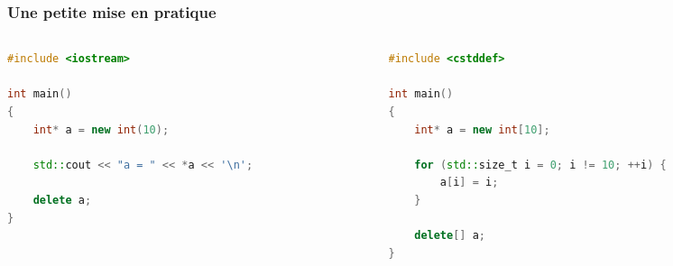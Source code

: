\documentclass{cppcourses}
\begin{document}
\begin{frame}[fragile]

\frametitle{Une petite mise en pratique}

\begin{columns}

\begin{column}{0.45 \textwidth}

\begin{example}

\begin{lstlisting}[language = c++]
#include <iostream>

int main()
{
    int* a = new int(10);

    std::cout << "a = " << *a << '\n';

    delete a;
}
\end{lstlisting}

\end{example}

\end{column}

\begin{column}{0.45 \textwidth}

\begin{example}

\begin{lstlisting}[language = c++]
#include <cstddef>

int main()
{
    int* a = new int[10];

    for (std::size_t i = 0; i != 10; ++i) {
        a[i] = i;
    }

    delete[] a;
}
\end{lstlisting}

\end{example}

\end{column}

\end{columns}

\end{frame}
\end{document}

